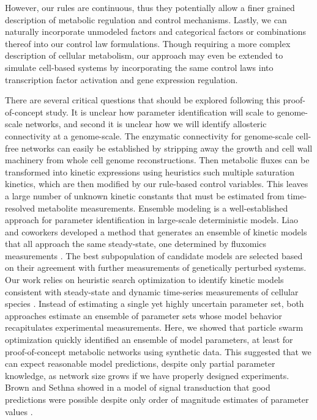 \documentclass[12pt]{article}
\begin{document}
However, our rules are continuous, thus they potentially allow a finer grained description of metabolic regulation and control mechanisms.
Lastly, we can naturally incorporate unmodeled factors and categorical factors or combinations thereof into our control law formulations. 
Though requiring a more complex description of cellular metabolism, our approach may even be extended to simulate cell-based systems by incorporating the same control laws into transcription factor activation and gene expression regulation. 

There are several critical questions that should be explored following this proof-of-concept study.
It is unclear how parameter identification will scale to genome-scale networks, and second it is unclear how we will identify allosteric connectivity at a genome-scale. 
The enzymatic connectivity for genome-scale cell-free networks can easily be established by stripping away the growth and cell wall machinery from whole cell genome reconstructions.
Then metabolic fluxes can be transformed into kinetic expressions using heuristics such multiple saturation kinetics, which are then modified by our rule-based control variables.  
This leaves a large number of unknown kinetic constants that must be estimated from time-resolved metabolite measurements. 
Ensemble modeling is a well-established approach for parameter identification in large-scale deterministic models. 
Liao and coworkers developed a method that generates an ensemble of kinetic models that all approach the same steady-state, one determined by fluxomics measurements \cite{Tran:2008aa}. 
The best subpopulation of candidate models are selected based on their agreement with further measurements of genetically perturbed systems. 
Our work relies on heuristic search optimization to identify kinetic models consistent with steady-state and dynamic time-series measurements of cellular species \citep{Luan:2007aa,Song:2009aa,Tasseff:2010aa,Tasseff:2011aa,Nayak:2011aa,Lequieu:2011aa}. 
Instead of estimating a single yet highly uncertain parameter set, both approaches estimate an ensemble of parameter sets whose model behavior recapitulates experimental measurements. 
Here, we showed that particle swarm optimization quickly identified an ensemble of model parameters, at least for proof-of-concept metabolic networks using synthetic data. 
This suggested that we can expect reasonable model predictions, despite only partial parameter knowledge, as network size grows if we have properly designed experiments. 
Brown and Sethna showed in a model of signal transduction that good predictions were possible despite only order of magnitude estimates of parameter values \citep{Brown:2003aa}.
\end{document}
